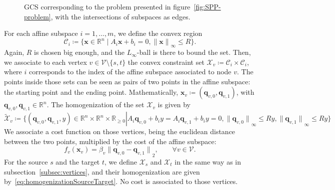 \documentclass[a4paper, 12pt]{article}
\newlength{\indentsize}
\begin{document}
\begin{figure}[!htb]
    \centering
    \caption{GCS corresponding to the problem presented in figure~\ref{fig:SPP-problem}, with the intersections of subspaces as edges.}\label{fig:edges}
\end{figure}

\hspace{\indentsize} For each affine subspace $i = 1, \dots, m$, we define the convex region \[\mathcal{C}_i \coloneq \{\mathbf{x} \in \mathbb{R}^n \mid A_i \mathbf{x} + b_i = 0, {\lVert \mathbf{x} \rVert}_\infty \leq R\}.\]
Again, $R$ is chosen big enough, and the $L_\infty$-ball is there to bound the set. Then, we associate to each vertex $v \in \mathcal{V}\setminus\{s, t\}$ the convex constraint set $\mathcal{X}_v \coloneq \mathcal{C}_i \times \mathcal{C}_i$, where $i$ corresponds to the index of the affine subspace associated to node $v$. The points inside those sets can be seen as pairs of two points in the affine subspace: the starting point and the ending point. Mathematically, $\mathbf{x}_v \coloneq (\mathbf{q}_{v,0}, \mathbf{q}_{v,1})$, with $\mathbf{q}_{v,0}, \mathbf{q}_{v,1} \in \mathbb{R}^n$. The homogenization of the set $\mathcal{X}_v$ is given by \[\tilde{\mathcal{X}}_v \coloneq \{(\mathbf{q}_{v,0}, \mathbf{q}_{v,1}, y) \in \mathbb{R}^n \times \mathbb{R}^n \times \mathbb{R}_{\geq 0} \left\lvert A_i \mathbf{q}_{v,0} + b_i y = A_i \mathbf{q}_{v,1} + b_i y = 0, {\lVert \mathbf{q}_{v,0} \rVert}_\infty \leq Ry, {\lVert \mathbf{q}_{v,1} \rVert}_\infty \leq Ry \right.\}\]
We associate a cost function on those vertices, being the euclidean distance between the two points, multiplied by the cost of the affine subspace: \[f_v(\mathbf{x}_v) = \beta_v {\lVert \mathbf{q}_{v,0} - \mathbf{q}_{v,1} \rVert}_2, \qquad \forall v \in \mathcal{V}.\]
For the source $s$ and the target $t$, we define $\mathcal{X}_s$ and $\mathcal{X}_t$ in the same way as in subsection~\ref{subsec:vertices}, and their homogenization are given by~\ref{eq:homogenizationSourceTarget}. No cost is associated to those vertices.
\end{document}
